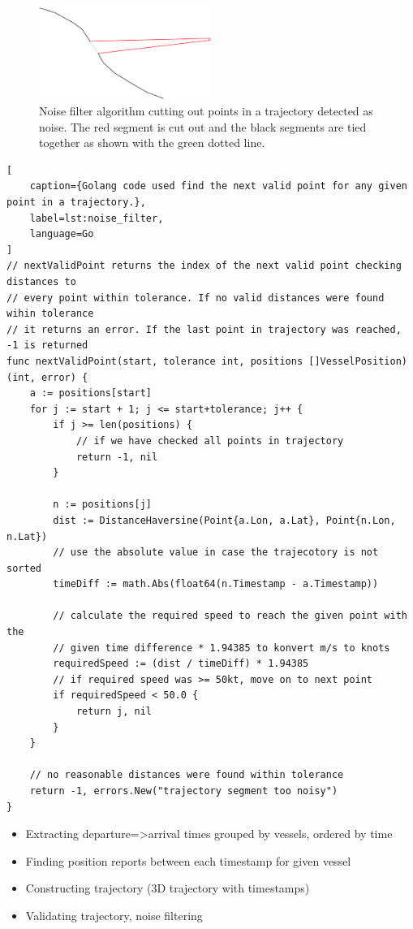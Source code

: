 \begin{figure}[htbp]  %
    \centering
    \includegraphics[width=0.5\textwidth]{figures/noise_filter}
    \caption{Noise filter algorithm cutting out points in a trajectory detected as noise. The red segment is cut out and the black segments are tied together as shown with the green dotted line.}
    \label{fig:noise_filter}
\end{figure}

\begin{lstlisting}[
    caption={Golang code used find the next valid point for any given point in a trajectory.},
    label=lst:noise_filter,
    language=Go
]
// nextValidPoint returns the index of the next valid point checking distances to
// every point within tolerance. If no valid distances were found wihin tolerance
// it returns an error. If the last point in trajectory was reached, -1 is returned
func nextValidPoint(start, tolerance int, positions []VesselPosition) (int, error) {
	a := positions[start]
	for j := start + 1; j <= start+tolerance; j++ {
		if j >= len(positions) {
			// if we have checked all points in trajectory
			return -1, nil
		}

		n := positions[j]
		dist := DistanceHaversine(Point{a.Lon, a.Lat}, Point{n.Lon, n.Lat})
		// use the absolute value in case the trajecotory is not sorted
		timeDiff := math.Abs(float64(n.Timestamp - a.Timestamp))

		// calculate the required speed to reach the given point with the
		// given time difference * 1.94385 to konvert m/s to knots
		requiredSpeed := (dist / timeDiff) * 1.94385
		// if required speed was >= 50kt, move on to next point
		if requiredSpeed < 50.0 {
			return j, nil
		}
	}

	// no reasonable distances were found within tolerance
	return -1, errors.New("trajectory segment too noisy")
}
\end{lstlisting}

\begin{itemize}
    \item Extracting departure=>arrival times grouped by vessels, ordered by time
    \item Finding position reports between each timestamp for given vessel
    \item Constructing trajectory (3D trajectory with timestamps)
    \item Validating trajectory, noise filtering
\end{itemize}

